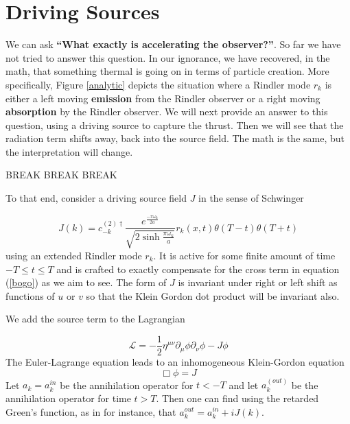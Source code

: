 \documentclass[12pt,a4paper]{article}
\begin{document}
\section{Driving Sources}

We can ask {\bf ``What exactly is accelerating the observer?''}.  So far we have not tried to answer this question.  In our ignorance, we have recovered, in the math, that something thermal is going on in terms of particle creation.  More specifically, Figure \ref{analytic} depicts the situation where a Rindler mode $r_k$ is either a left moving {\bf emission} from the Rindler observer or a right moving {\bf absorption} by the Rindler observer.  We will next provide an answer to this question, using a driving source to capture the thrust. Then we will see that the radiation term shifts away, back into the source field.  The math is the same, but the interpretation will change.


BREAK BREAK BREAK


To that end, consider a driving source field $J$ in the sense of Schwinger \cite{schwinger} 

\begin{equation}
  J(k) = c_{-k}^{(2)\dagger} \frac{e^\frac{-\pi \omega_k}{2a}}{\sqrt{2 \sinh \frac{\pi \omega_k}{a}}} r_k(x,t) \theta(T - t) \theta(T+t)
\end{equation}
using an extended Rindler mode $r_k$.  It is active for some finite amount of time $-T \le t \le T$ and is crafted to exactly compensate for the cross term in equation (\ref{bogo}) as we aim to see.  The form of $J$ is invariant under right or left shift as functions of $u$ or $v$ so that the Klein Gordon dot product will be invariant also.

We add the source term to the Lagrangian

\begin{equation}
\mathscr{L} = -\frac{1}{2} \eta^{\mu\nu}\partial_\mu \phi \partial_\nu \phi - J\phi
\end{equation}
The Euler-Lagrange equation leads to an inhomogeneous Klein-Gordon equation
\begin{equation}
  \Box  \phi = J
\end{equation}
Let $a_k = a_k^{in}$ be the annihilation operator for $t<-T$ and let $a_k^{(out)}$ be the annihilation operator for time $t > T$.  Then one can find using the retarded Green's function, as in \cite{beisert} for instance, that $a_k^{out} = a_k^{in} + i J(k)$.
\end{document}
